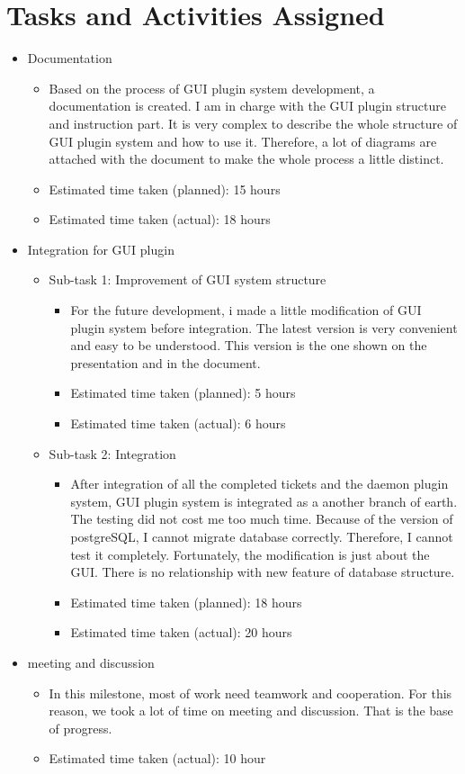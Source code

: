 \documentclass{article}
\begin{document}
\section*{Tasks and Activities Assigned}
\begin{itemize}
	\item Documentation
		\begin{itemize}
	        	\item Based on the process of GUI plugin system development, a documentation is created. I am in charge with the GUI plugin structure and instruction part. It is very complex to describe the whole structure of GUI plugin system and how to use it. Therefore, a lot of diagrams are attached with the document to make the whole process a little distinct.
			\item Estimated time taken (planned): 15 hours
			\item Estimated time taken (actual): 18 hours
		\end{itemize}			
	\item Integration for GUI plugin
	     \begin{itemize}
	         \item Sub-task 1: Improvement of GUI system structure
	            \begin{itemize}
			\item For the future development, i made a little modification of GUI plugin system before integration. The latest version is very convenient and easy to be understood. This version is the one shown on the presentation and in the document.
			\item Estimated time taken (planned): 5 hours
			\item Estimated time taken (actual): 6 hours
			\end{itemize}
	         \item Sub-task 2: Integration
	            \begin{itemize}
			\item After integration of all the completed tickets and the daemon plugin system, GUI plugin system is integrated as a another branch of earth. The testing did not cost me too much time. Because of the version of postgreSQL, I cannot migrate database correctly. Therefore, I cannot test it completely. Fortunately, the modification is just about the GUI. There is no relationship with new feature of database structure.
			\item Estimated time taken (planned): 18 hours
			\item Estimated time taken (actual): 20 hours
		\end{itemize}
	     \end{itemize}
	\item meeting and discussion
	     \begin{itemize}
	         \item In this milestone, most of work need teamwork and cooperation. For this reason, we took a lot of time on meeting and discussion. That is the base of progress.
	         \item Estimated time taken (actual): 10 hour
	     \end{itemize}
\end{itemize}
\end{document}

